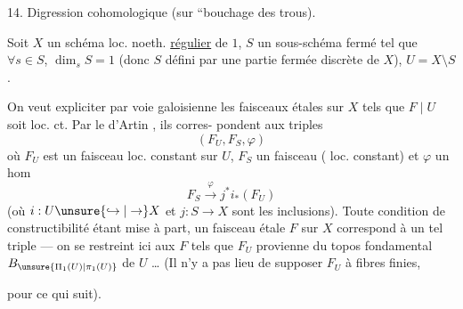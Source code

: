 
14. Digression cohomologique (sur  ``bouchage des
trous).

Soit $X$ un schéma loc. noeth. \uline{régulier} de
 $1$, $S$ un sous-schéma fermé  tel que
$\forall s\in S$, $\dim_s S=1$ (donc $S$ défini par une
partie fermée discrète de $X$), $U=X\setminus S$.

On veut expliciter par voie galoisienne les
faisceaux  étales  sur $X$ tels que $F\mid U$ soit
loc. ct. Par le  d'Artin , ils corres-
pondent aux triples
\[
(F_U,F_S,\varphi)
\]
où $F_U$ est un faisceau  loc. constant sur $U$,
$F_S$ un faisceau ( loc. constant)
et $\varphi$ un hom
\[
F_S\xrightarrow{\varphi}j^{*}i_{*}(F_U)
\]
(où $i:U\unsure{\hookrightarrow|\to}X$ et $j:S\to X$ sont les inclusions).
Toute condition de constructibilité étant mise à
part, un faisceau étale $F$ sur $X$ correspond
à un tel triple --- on se restreint ici aux
$F$ tels que $F_U$  provienne du
topos fondamental $B_{\unsure{\Pi_1(U)|\pi_1(U)}}$ de $U$ \dots
(Il n'y a pas lieu de supposer $F_U$ à fibres finies,


pour ce qui suit). 

